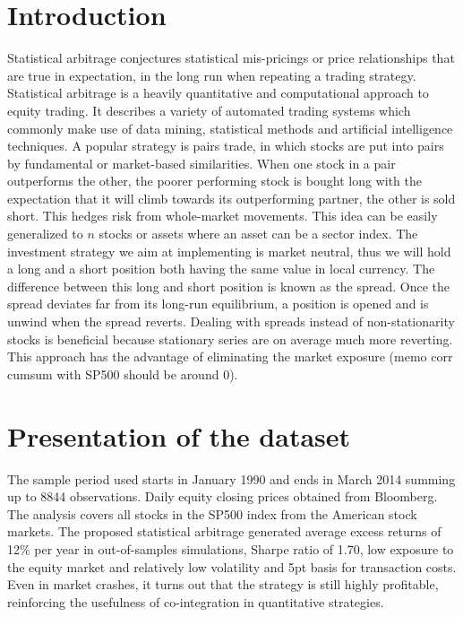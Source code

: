 \documentclass[11pt,a4,twosided,singlespacing,titlepagenumber=on]{scrreprt}
\numberwithin{equation}{chapter} %
\theoremstyle{remark}
\begin{document}
\section{Introduction}
Statistical arbitrage conjectures statistical mis-pricings or price relationships that are true in expectation, in the long run when repeating a trading strategy. Statistical arbitrage is a heavily quantitative and computational approach to equity trading. It describes a variety of automated trading systems which commonly make use of data mining, statistical methods and artificial intelligence techniques. A popular strategy is pairs trade, in which stocks are put into pairs by fundamental or market-based similarities. When one stock in a pair outperforms the other, the poorer performing stock is bought long with the expectation that it will climb towards its outperforming partner, the other is sold short. This hedges risk from whole-market movements. This idea can be easily generalized to $n$ stocks or assets where an asset can be a sector index. The investment strategy we aim at implementing is market neutral, thus we will hold a long and a short position both having the same value in local currency. The difference between this long and short position is known as the spread. Once the spread deviates far from its long-run equilibrium, a position is opened and is unwind when the spread reverts. Dealing with spreads instead of non-stationarity stocks is beneficial because stationary series are on average much more reverting. This approach has the advantage of eliminating the market exposure (memo corr cumsum with SP500 should be around 0).

\section{Presentation of the dataset}
The sample period used starts in January 1990 and ends in March 2014 summing up to 8844 observations. Daily equity closing prices obtained from Bloomberg. The analysis covers all stocks in the SP500 index from the American stock markets. The proposed statistical arbitrage generated average excess returns of 12\% per year in out-of-samples simulations, Sharpe ratio of 1.70, low exposure to the equity market and relatively low volatility and 5pt basis for transaction costs. Even in market crashes, it turns out that the strategy is still highly profitable, reinforcing the usefulness of co-integration in quantitative strategies.
\end{document}
